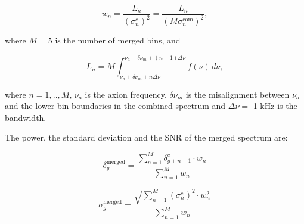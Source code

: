 \begin{equation}
    \label{eq:merge_weight}
    w_{n} = \frac{L_{n}}{(\sigma_{n}^{c})^{2}} = \frac{L_{n}}{(M\sigma_{n}^\text{com})^{2}},
\end{equation}

where $M = 5$ is the number of merged bins, and 


\begin{equation}
    \label{eq:Lq_integtal}
    L_{n} = M \int_{\nu_a +\delta\nu_m + n\Delta\nu}^{\nu_a +\delta\nu_m + (n+1)\Delta\nu} f(\nu) \,d\nu,
\end{equation}


where $n = 1,..,M$, $\nu_a$ is the axion frequency, $\delta\nu_m$ is the misalignment between $\nu_a$ and the lower bin boundaries
in the combined spectrum and $\Delta\nu =$ 1 kHz is the bandwidth.

The power, the standard deviation and the SNR of the merged spectrum are:


\begin{equation}
    \label{eq:merged_power}
    \delta_{g}^\text{merged} = \frac{ \sum_{n = 1}^{M}\delta_{g+n-1}^{c} \cdot {w_{n}}}{\sum_{n = 1}^{M} {w_{n}}}
\end{equation}

\begin{equation}
    \label{eq:merged_sigma}
    \sigma_{g}^\text{merged} =  \frac{ \sqrt{\sum_{n = 1}^{M} (\sigma_{n}^{c})^2 \cdot {w_{n}^2}}}{\sum_{n = 1}^{M} {w_{n}}}
\end{equation}

